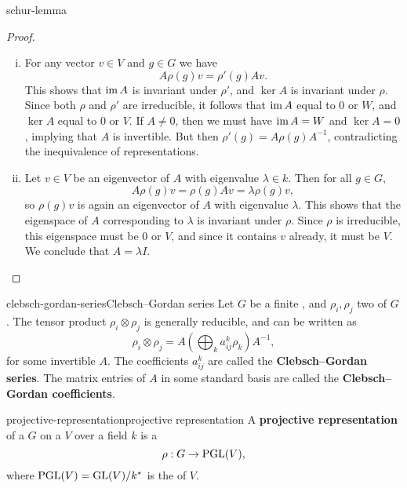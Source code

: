\begin{example}{schur-lemma}
    \begin{proof}
    \begin{enumerate}[(i)]
        \item For any vector $v \in V$ and $g \in G$ we have
        \[ A \rho(g) v = \rho'(g) A v . \]
        This shows that $\operatorname{im} A$ is invariant under $\rho'$, and $\ker A$ is invariant under $\rho$. Since both $\rho$ and $\rho'$ are irreducible, it follows that $\operatorname{im} A$ equal to $0$ or $W$, and $\ker A$ equal to $0$ or $V$. If $A \ne 0$, then we must have $\operatorname{im} A = W$ and $\ker A = 0$, implying that $A$ is invertible. But then $\rho'(g) = A \rho(g) A^{-1}$, contradicting the inequivalence of representations.
        \item Let $v \in V$ be an eigenvector of $A$ with eigenvalue $\lambda \in k$. Then for all $g \in G$,
        \[ A \rho(g) v = \rho(g) A v = \lambda \rho(g) v , \]
        so $\rho(g) v$ is again an eigenvector of $A$ with eigenvalue $\lambda$. This shows that the eigenspace of $A$ corresponding to $\lambda$ is invariant under $\rho$. Since $\rho$ is irreducible, this eigenspace must be $0$ or $V$, and since it contains $v$ already, it must be $V$. We conclude that $A = \lambda I$.
    \end{enumerate}
    \end{proof}
\end{example}

\begin{topic}{clebsch-gordan-series}{Clebsch--Gordan series}
    Let $G$ be a finite , and $\rho_i, \rho_j$ two   of $G$. The tensor product $\rho_i \otimes \rho_j$ is generally reducible, and can be written as
    \[ \rho_i \otimes \rho_j = A \left( \bigoplus_k a^k_{ij} \rho_k \right) A^{-1} , \]
    for some invertible $A$. The coefficients $a^k_{ij}$ are called the \textbf{Clebsch--Gordan series}. The matrix entries of $A$ in some standard basis are called the \textbf{Clebsch--Gordan coefficients}.
\end{topic}

\begin{topic}{projective-representation}{projective representation}
    A \textbf{projective representation} of a  $G$ on a  $V$ over a field $k$ is a 
    \[ \rho : G \to \textup{PGL}(V) , \]
    where $\textup{PGL}(V) = \textup{GL}(V) / k^*$ is the  of $V$.
\end{topic}

